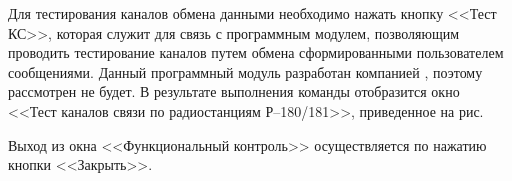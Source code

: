 Для тестирования каналов обмена данными необходимо нажать кнопку <<Тест КС>>, которая служит для связь с программным
модулем, позволяющим проводить тестирование каналов путем обмена сформированными пользователем сообщениями. Данный
программный модуль разработан компанией \company, поэтому рассмотрен не будет.
В результате выполнения команды отобразится окно <<Тест каналов связи по радиостанциям Р–180/181>>, приведенное на рис.

Выход из окна <<Функциональный контроль>> осуществляется по нажатию кнопки <<Закрыть>>.






